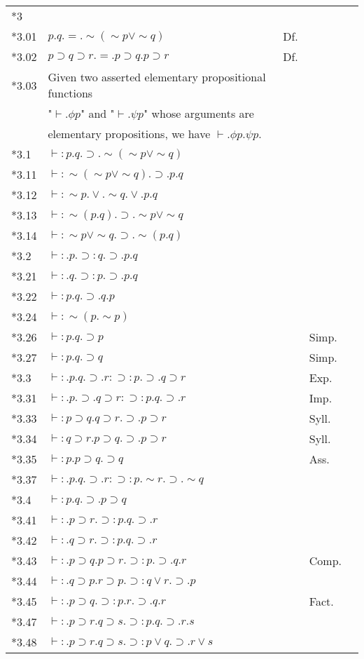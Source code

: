 \noindent\begin{tabular}[t]{l@{\quad}l@{\quad}l@{\quad}ll}
{*3}\\
{*3.01} & $p.q.=.\sim(\sim{p}\vee\sim{q})$ & Df.\\
{*3.02} & $p\supset{q}\supset{r}.=.p\supset{q}.p\supset{r}$ & Df.\\
{*3.03} & Given two asserted elementary propositional functions\\
& "$\vdash.\phi{p}$" and "$\vdash.\psi{p}$" whose arguments are\\
& elementary propositions, we have $\vdash.\phi{p}.\psi{p}$.\\
{*3.1} & $\vdash:p.q.\supset.\sim(\sim{p}\vee\sim{q})$\\
{*3.11} & $\vdash:\sim(\sim{p}\vee\sim{q}).\supset.p.q$\\
{*3.12} & $\vdash:\sim{p}.\vee.\sim{q}.\vee.p.q$\\
{*3.13} & $\vdash:\sim(p.q).\supset.\sim{p}\vee\sim{q}$\\
{*3.14} & $\vdash:\sim{p}\vee\sim{q}.\supset.\sim(p.q)$\\
{*3.2} & $\vdash:.p.\supset:q.\supset.p.q$\\
{*3.21} & $\vdash:.q.\supset:p.\supset.p.q$\\
{*3.22} & $\vdash:p.q.\supset.q.p$\\
{*3.24} & $\vdash:\sim(p.\sim{p})$\\
{*3.26} & $\vdash:p.q.\supset{p}$ && Simp.\\
{*3.27} & $\vdash:p.q.\supset{q}$ && Simp.\\
{*3.3} & $\vdash:.p.q.\supset.r:\supset:p.\supset.q\supset{r}$ && Exp.\\
{*3.31} & $\vdash:.p.\supset.q\supset{r}:\supset:p.q.\supset.r$ && Imp.\\
{*3.33} & $\vdash:p\supset{q}.q\supset{r}.\supset.p\supset{r}$ && Syll.\\
{*3.34} & $\vdash:q\supset{r}.p\supset{q}.\supset.p\supset{r}$ && Syll.\\
{*3.35} & $\vdash:p.p\supset{q}.\supset{q}$ && Ass.\\
{*3.37} & $\vdash:.p.q.\supset.r:\supset:p.\sim{r}.\supset.\sim{q}$\\
{*3.4} & $\vdash:p.q.\supset.p\supset{q}$\\
{*3.41} & $\vdash:.p\supset{r}.\supset:p.q.\supset.r$\\
{*3.42} & $\vdash:.q\supset{r}.\supset:p.q.\supset.r$\\
{*3.43} & $\vdash:.p\supset{q}.p\supset{r}.\supset:p.\supset.q.r$ && Comp.\\
{*3.44} & $\vdash:.q\supset{p}.r\supset{p}.\supset:q\vee{r}.\supset.p$\\
{*3.45} & $\vdash:.p\supset{q}.\supset:p.r.\supset.q.r$ && Fact.\\
{*3.47} & $\vdash:.p\supset{r}.q\supset{s}.\supset:p.q.\supset.r.s$\\
{*3.48} & $\vdash:.p\supset{r}.q\supset{s}.\supset:p\vee{q}.\supset.r\vee{s}$\\
\end{tabular}